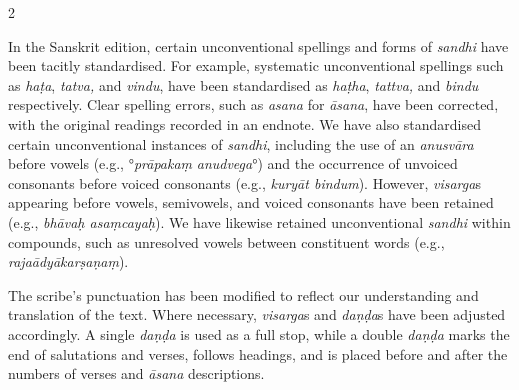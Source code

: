\begin{nohyp}
\begin{multicols*}{2}
\begin{eng}
In the Sanskrit edition, certain unconventional spellings and forms of \emph{sandhi} have been tacitly standardised. For example, systematic unconventional spellings such as \emph{haṭa}, \emph{tatva,} and \emph{vindu}, have been standardised as \emph{haṭha}, \emph{tattva,} and \emph{bindu} respectively. Clear spelling errors, such as \emph{asana} for \emph{āsana}, have been corrected, with the original readings recorded in an endnote. We have also standardised certain unconventional instances of \emph{sandhi}, including the use of an \emph{anusvāra} before vowels (e.g., °\emph{prāpakaṃ} \emph{anudvega}°) and the occurrence of unvoiced consonants before voiced consonants (e.g., \emph{kuryāt bindum}). However, \emph{visarga}s appearing before vowels, semivowels, and voiced consonants have been retained (e.g., \emph{bhāvaḥ asaṃcayaḥ}). We have likewise retained unconventional \emph{sandhi} within compounds, such as unresolved vowels between constituent words (e.g., \emph{rajaādyākarṣaṇaṃ}).

The scribe's punctuation has been modified to reflect our understanding and translation of the text. Where necessary, \emph{visarga}s and \emph{daṇḍa}s have been adjusted accordingly. A single \emph{daṇḍa} is used as a full stop, while a double \emph{daṇḍa} marks the end of salutations and verses, follows headings, and is placed before and after the numbers of verses and \emph{āsana} descriptions.


\end{eng}
\end{multicols*}
\end{nohyp}
